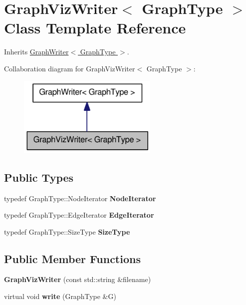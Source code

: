 \hypertarget{class_graph_viz_writer}{
\section{GraphVizWriter$<$ GraphType $>$ Class Template Reference}
\label{class_graph_viz_writer}
}


Inherits \hyperlink{class_graph_writer}{GraphWriter$<$ GraphType $>$}.



Collaboration diagram for GraphVizWriter$<$ GraphType $>$:\nopagebreak
\begin{figure}[H]
\begin{center}
\leavevmode
\includegraphics[width=190pt]{class_graph_viz_writer__coll__graph}
\end{center}
\end{figure}
\subsection*{Public Types}
\begin{DoxyCompactItemize}
\item 
\hypertarget{class_graph_viz_writer_a03968a4197466c656ae5c9484b3b34c2}{
typedef GraphType::NodeIterator {\bfseries NodeIterator}}
\label{class_graph_viz_writer_a03968a4197466c656ae5c9484b3b34c2}

\item 
\hypertarget{class_graph_viz_writer_a310b913e5da9b570c031f367f8892e92}{
typedef GraphType::EdgeIterator {\bfseries EdgeIterator}}
\label{class_graph_viz_writer_a310b913e5da9b570c031f367f8892e92}

\item 
\hypertarget{class_graph_viz_writer_a1f5e0e2ad5013794346d07ae9f64cb55}{
typedef GraphType::SizeType {\bfseries SizeType}}
\label{class_graph_viz_writer_a1f5e0e2ad5013794346d07ae9f64cb55}

\end{DoxyCompactItemize}
\subsection*{Public Member Functions}
\begin{DoxyCompactItemize}
\item 
\hypertarget{class_graph_viz_writer_ade0265b4a14be878f587346983df932f}{
{\bfseries GraphVizWriter} (const std::string \&filename)}
\label{class_graph_viz_writer_ade0265b4a14be878f587346983df932f}

\item 
\hypertarget{class_graph_viz_writer_a04082c2007f9e25aec23731ab3fe8d35}{
virtual void {\bfseries write} (GraphType \&G)}
\label{class_graph_viz_writer_a04082c2007f9e25aec23731ab3fe8d35}

\end{DoxyCompactItemize}
